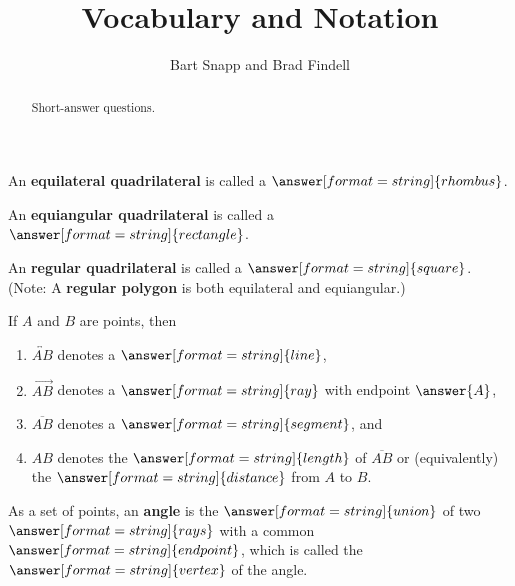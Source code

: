 \documentclass[nooutcomes]{ximera}
\title{Vocabulary and Notation}
\author{Bart Snapp and Brad Findell}
\begin{document}
\begin{abstract}
Short-answer questions. 
\end{abstract}
\maketitle


\begin{question}  
An \textbf{equilateral quadrilateral} is called a $\answer[format=string]{rhombus}$.
\end{question}

\begin{question}  
An \textbf{equiangular quadrilateral} is called a $\answer[format=string]{rectangle}$. 
\end{question}

\begin{question}  
An \textbf{regular quadrilateral} is called a $\answer[format=string]{square}$. (Note: A \textbf{regular polygon} is both equilateral and equiangular.)

\end{question}


\begin{question}
If $A$ and $B$ are points, then 
\begin{enumerate}
\item $\overleftrightarrow{AB}$ denotes a $\answer[format=string]{line}$, 
\item $\overrightarrow{AB}$ denotes a $\answer[format=string]{ray}$ with endpoint $\answer{A}$,  
\item $\overline{AB}$ denotes a $\answer[format=string]{segment}$, and 
\item $AB$ denotes the $\answer[format=string]{length}$ of $\overline{AB}$ or (equivalently) the $\answer[format=string]{distance}$ from $A$ to $B$.  
\end{enumerate}
\end{question}


\begin{question}
As a set of points, an \textbf{angle} is the $\answer[format=string]{union}$ of two $\answer[format=string]{rays}$ with a common $\answer[format=string]{endpoint}$, which is called the $\answer[format=string]{vertex}$ of the angle.  \end{question}
\end{document}
